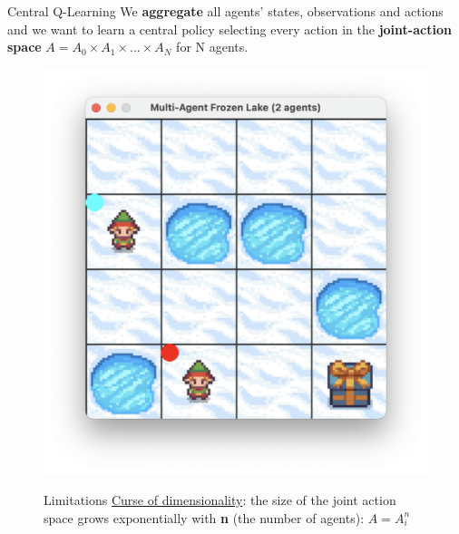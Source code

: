 \documentclass[aspectratio=169,xcolor=dvipsnames]{beamer}
\begin{document}
\begin{frame}{Central Q-Learning}
    We \textbf{aggregate} all agents' states, observations and actions and we want to learn a central policy selecting every action in the \textbf{joint-action space} $A = A_0 \times A_1 \times ... \times A_N$ for N agents.

    \begin{figure}[h!]
        \centering
        \begin{minipage}{0.45\textwidth} 
            \centering
            \includegraphics[scale=0.3]{images/multi-agent.png}
        \end{minipage}%
        \begin{minipage}{0.45\textwidth} 
            \begin{alertblock}{Limitations}
            \underline{Curse of dimensionality}: the size of the joint action space grows exponentially with \textbf{n} (the number of agents): $A = A_i^n$
            \end{alertblock}
        \end{minipage}
    \end{figure}

\end{frame}

\end{document}
